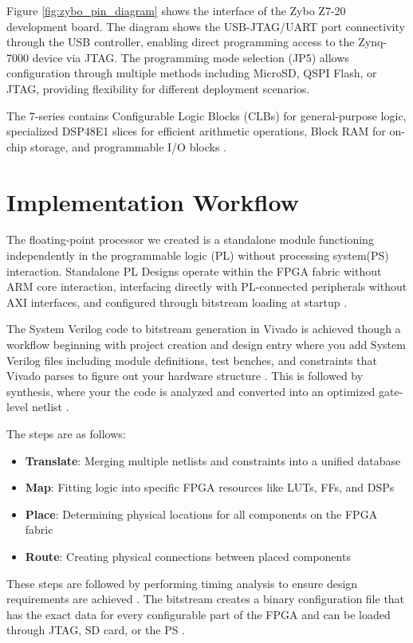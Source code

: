 Figure \ref{fig:zybo_pin_diagram} shows the interface of the Zybo Z7-20 development board. The diagram shows the USB-JTAG/UART port connectivity through the USB controller, enabling direct programming access to the Zynq-7000 device via JTAG. The programming mode selection (JP5) allows configuration through multiple methods including MicroSD, QSPI Flash, or JTAG, providing flexibility for different deployment scenarios.

The 7-series contains Configurable Logic Blocks (CLBs) for general-purpose logic, specialized DSP48E1 slices for efficient arithmetic operations, Block RAM for on-chip storage, and programmable I/O blocks \cite{ref24}.

\section{Implementation Workflow}
\label{sec:implementation_workflow}

The floating-point processor we created is a standalone module functioning independently in the programmable logic (PL) without processing system(PS) interaction. Standalone PL Designs operate within the FPGA fabric without ARM core interaction, interfacing directly with PL-connected peripherals without AXI interfaces, and configured through bitstream loading at startup \cite{ref23}.

The System Verilog code to bitstream generation in Vivado is achieved though a workflow beginning with project creation and design entry where you add System Verilog files including module definitions, test benches, and constraints that Vivado parses to figure out your hardware structure \cite{ref24}. This is followed by synthesis, where your the code is analyzed and converted into an optimized gate-level netlist \cite{ref24}.

The steps are as follows:
\begin{itemize}
    \item \textbf{Translate}: Merging multiple netlists and constraints into a unified database
    \item \textbf{Map}: Fitting logic into specific FPGA resources like LUTs, FFs, and DSPs
    \item \textbf{Place}: Determining physical locations for all components on the FPGA fabric
    \item \textbf{Route}: Creating physical connections between placed components
\end{itemize}

These steps are followed by performing timing analysis to ensure design requirements are achieved \cite{ref24}. The bitstream creates a binary configuration file that has the exact data for every configurable part of the FPGA and can be loaded through JTAG, SD card, or the PS \cite{ref24}.

